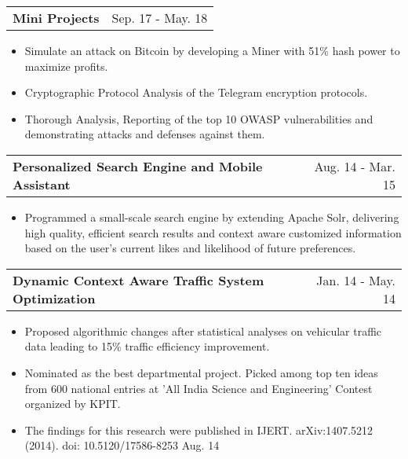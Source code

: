 \documentclass[a4paper,10pt]{article}
\makeatletter
\newcommand{\projectHeading}[2]{
    \begin{tabular*}{1\textwidth}{l@{\extracolsep{\fill}}r}
      \large{\textbf{#1}} & \small{#2} 
    \end{tabular*}
}
\newcommand{\resumeItemListStart}{\begin{itemize}[topsep=2.2pt, parsep=1pt, listparindent=0pt, itemindent=0pt, itemsep=1pt, leftmargin=*]}
\newcommand{\resumeItemListEnd}{\end{itemize}}
\makeatother
\begin{document}
    \projectHeading{Mini Projects}{Sep. 17 - May. 18} 
    \resumeItemListStart
    	 \item\small{Simulate an attack on Bitcoin by developing a Miner with 51\% hash power to maximize profits.}
    	 \item\small{Cryptographic Protocol Analysis of the Telegram encryption protocols.}
    	 \item\small{Thorough Analysis, Reporting of the top 10 OWASP vulnerabilities and demonstrating attacks and defenses against them.}
    \resumeItemListEnd
    
   \projectHeading{Personalized Search Engine and Mobile Assistant}{Aug. 14 - Mar. 15} 
    \resumeItemListStart
       \item\small{Programmed a small-scale search engine by extending Apache Solr, delivering high quality, efficient search results and context aware customized information based on the user's current likes and likelihood of future preferences.}
     \resumeItemListEnd
   
   \projectHeading{Dynamic Context Aware Traffic System Optimization}{Jan. 14 - May. 14} 
    \resumeItemListStart
       \item\small{Proposed algorithmic changes after statistical analyses on vehicular traffic data leading to 15\% traffic efficiency improvement.}
       \item\small{Nominated as the best departmental project. Picked among top ten ideas from 600 national entries at 'All India Science and Engineering' Contest organized by KPIT.}
       \item\small{The findings for this research were published in IJERT. arXiv:1407.5212 (2014). doi: 10.5120/17586-8253 Aug. 14}
     \resumeItemListEnd

   
 
\end{document}
